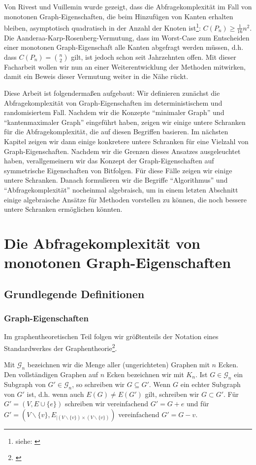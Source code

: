 \documentclass[10pt,a4paper, footheight=1mm]{scrreprt}
\theoremstyle{definition}
\begin{document}
Von Rivest und Vuillemin wurde gezeigt,
dass die Abfragekomplexität
im Fall von monotonen Graph-Eigenschaften, die beim 
Hinzufügen von Kanten erhalten bleiben, asymptotisch
quadratisch in der Anzahl der Knoten
ist\footnote{siehe: \cite[Theorem 6]{Rivest}}: $C(P_n) \geq \frac{1}{16}n^2$.
Die Aanderaa-Karp-Rosenberg-Vermutung, dass im Worst-Case
zum Entscheiden einer monotonen Graph-Eigenschaft
alle Kanten abgefragt werden müssen, d.h. dass
$C(P_n)=\binom{n}{2}$ gilt, ist jedoch schon
seit Jahrzehnten offen. Mit dieser Facharbeit
wollen wir nun an einer Weiterentwicklung der
Methoden mitwirken, damit ein Beweis dieser Vermutung
weiter in die Nähe rückt.

Diese Arbeit ist folgendermaßen aufgebaut:
Wir definieren zunächst die Abfragekomplexität
von Graph-Eigenschaften im deterministischem und
randomisiertem Fall. Nachdem wir die Konzepte
"`minimaler Graph"' und "`kantenmaximaler Graph"'
eingeführt haben, zeigen wir einige untere Schranken
für die Abfragekomplexität, die auf diesen Begriffen
basieren. Im nächsten Kapitel zeigen wir dann einige
konkretere untere Schranken für eine Vielzahl von
Graph-Eigenschaften. Nachdem wir die Grenzen 
dieses Ansatzes ausgeleuchtet haben, verallgemeinern
wir das Konzept der Graph-Eigenschaften auf 
symmetrische Eigenschaften von Bitfolgen. Für
diese Fälle zeigen wir einige untere Schranken.
Danach formulieren wir die Begriffe "`Algorithmus"'
und "`Abfragekomplexität"' nocheinmal algebraisch, um
in einem letzten Abschnitt
einige algebraische Ansätze für Methoden vorstellen zu
können, die noch bessere untere Schranken ermöglichen könnten.

\chapter{Die Abfragekomplexität von monotonen Graph-Eigenschaften}
\section{Grundlegende Definitionen}
\subsection{Graph-Eigenschaften}
Im graphentheoretischen Teil folgen wir größtenteils
der Notation eines Standardwerkes der Graphentheorie\footnote{\cite{diestel}}.

Mit $\mathcal{G}_n$ bezeichnen wir die Menge aller
(ungerichteten) Graphen mit $n$ Ecken.
Den vollständigen Graphen auf $n$ Ecken bezeichnen wir
mit $K_n$.
Ist $G \in \mathcal{G}_n$ ein Subgraph von $G' \in \mathcal{G}_n$,
so schreiben wir $G \subseteq G'$. Wenn $G$ ein
echter Subgraph von $G'$ ist, d.h. wenn auch $E(G) \neq E(G')$ gilt, schreiben
wir $G \subset G'$.
Für $G' = (V, E \cup \{e\})$ schreiben wir vereinfachend
$G' = G + e$ und für 
$G' = (V \backslash \{v\}, E_{|(V \backslash \{v\})\times (V \backslash \{v\})})$ vereinfachend $G' = G - v$.
\end{document}
